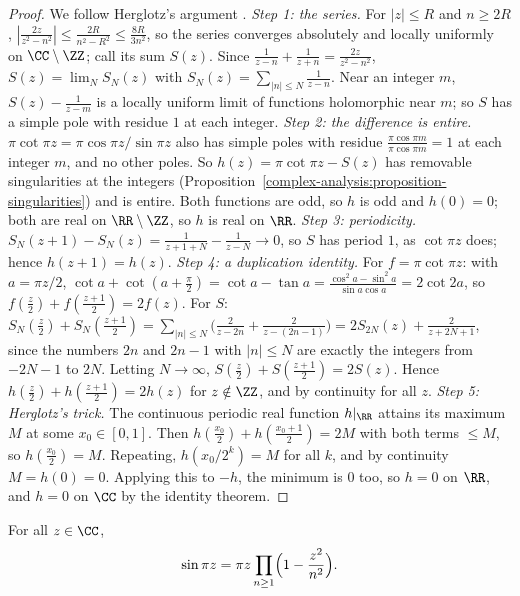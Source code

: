 \begin{proof}
We follow Herglotz's argument \cite{aigner-ziegler}.
\emph{Step 1: the series.} For $|z| \leq R$ and $n \geq 2R$, $|\frac{2z}{z^2 - n^2}| \leq \frac{2R}{n^2 - R^2} \leq \frac{8R}{3n^2}$, so the series converges absolutely and locally uniformly on
$\CC \setminus \ZZ$; call its sum $S(z)$. Since $\frac{1}{z - n} + \frac{1}{z + n} = \frac{2z}{z^2 - n^2}$, $S(z) = \lim_NS_N(z)$ with $S_N(z) = \sum_{|n| \leq N}\frac{1}{z - n}$. Near an integer $m$,
$S(z) - \frac{1}{z - m}$ is a locally uniform limit of functions holomorphic near $m$; so $S$ has a simple pole with residue $1$ at each integer.
\emph{Step 2: the difference is entire.} $\pi\cot\pi z = \pi\cos\pi z/\sin\pi z$ also has simple poles with residue $\frac{\pi\cos\pi m}{\pi\cos\pi m} = 1$ at each integer $m$, and no other poles. So
$h(z) = \pi\cot\pi z - S(z)$ has removable singularities at the integers (Proposition~\ref{complex-analysis:proposition-singularities}) and is entire. Both functions are odd, so $h$ is odd and
$h(0) = 0$; both are real on $\RR \setminus \ZZ$, so $h$ is real on $\RR$.
\emph{Step 3: periodicity.} $S_N(z + 1) - S_N(z) = \frac{1}{z + 1 + N} - \frac{1}{z - N} \to 0$, so $S$ has period $1$, as $\cot\pi z$ does; hence $h(z + 1) = h(z)$.
\emph{Step 4: a duplication identity.} For $f = \pi\cot\pi z$: with $a = \pi z/2$, $\cot a + \cot(a + \frac\pi2) = \cot a - \tan a = \frac{\cos^2a - \sin^2a}{\sin a\cos a} = 2\cot 2a$, so
$f(\frac z2) + f(\frac{z + 1}2) = 2f(z)$. For $S$: $S_N(\frac z2) + S_N(\frac{z + 1}2) = \sum_{|n| \leq N}\bigl(\frac{2}{z - 2n} + \frac{2}{z - (2n - 1)}\bigr) = 2S_{2N}(z) + \frac{2}{z + 2N + 1}$, since the
numbers $2n$ and $2n - 1$ with $|n| \leq N$ are exactly the integers from $-2N - 1$ to $2N$. Letting $N \to \infty$, $S(\frac z2) + S(\frac{z + 1}2) = 2S(z)$. Hence $h(\frac z2) + h(\frac{z + 1}2) = 2h(z)$
for $z \notin \ZZ$, and by continuity for all $z$.
\emph{Step 5: Herglotz's trick.} The continuous periodic real function $h|_\RR$ attains its maximum $M$ at some $x_0 \in [0, 1]$. Then $h(\frac{x_0}2) + h(\frac{x_0 + 1}2) = 2M$ with both terms $\leq M$, so
$h(\frac{x_0}2) = M$. Repeating, $h(x_0/2^k) = M$ for all $k$, and by continuity $M = h(0) = 0$. Applying this to $-h$, the minimum is $0$ too, so $h = 0$ on $\RR$, and $h = 0$ on $\CC$ by the identity
theorem.
\end{proof}

\begin{corollary}\label{special-functions:corollary-sine-product}
For all $z \in \CC$,
\[
\sin\pi z = \pi z\prod_{n \geq 1}\Bigl(1 - \frac{z^2}{n^2}\Bigr).
\]
\end{corollary}

